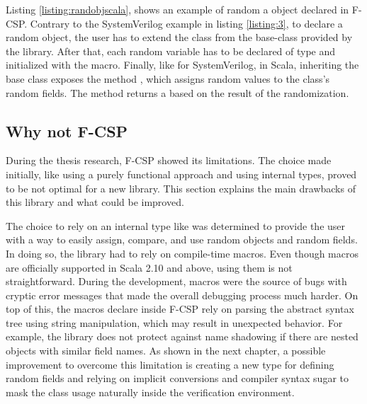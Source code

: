 Listing \ref{listing:randobjscala}, shows an example of random a object declared
in F-CSP. Contrary to the SystemVerilog example in listing \ref{listing:3}, to
declare a random object, the user has to extend the class from the
 base-class provided by the library. After that, each random
variable has to be declared of type  and initialized with the
 macro. Finally, like for SystemVerilog, in Scala, inheriting the
 base class exposes the method , which assigns
random values to the class's random fields. The method  returns
a  based on the result of the randomization.


\subsection{Why not F-CSP}\label{sec:csp:whynotfcsp}
During the thesis research, F-CSP showed its limitations. The choice made
initially, like using a purely functional approach and using internal types,
proved to be not optimal for a new library. This section explains the main
drawbacks of this library and what could be improved.

The choice to rely on an internal type like  was determined to
provide the user with a way to easily assign, compare, and use random objects
and random fields. In doing so, the library had to rely on compile-time macros.
Even though macros are officially supported in Scala 2.10 and above, using them
is not straightforward. During the development, macros were the source of bugs
with cryptic error messages that made the overall debugging process much harder.
On top of this, the macros declare inside F-CSP rely on parsing the abstract
syntax tree using string manipulation, which may result in unexpected behavior.
For example, the library does not protect against name shadowing if there are
nested objects with similar field names. As shown in the next chapter, a
possible improvement to overcome this limitation is creating a new type for
defining random fields and relying on implicit conversions and compiler syntax
sugar to mask the class usage naturally inside the verification environment.

